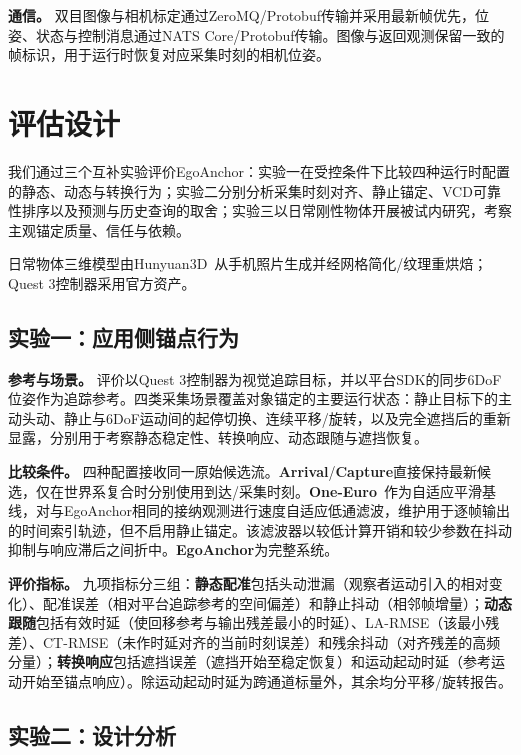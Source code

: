 \documentclass[review]{vgtc}
\begin{document}
\textbf{通信。}
双目图像与相机标定通过ZeroMQ/Protobuf传输并采用最新帧优先，位姿、状态与控制消息通过NATS Core/Protobuf传输。图像与返回观测保留一致的帧标识，用于运行时恢复对应采集时刻的相机位姿。

\section{评估设计}\label{sec:evaluation}
我们通过三个互补实验评价EgoAnchor：实验一在受控条件下比较四种运行时配置的静态、动态与转换行为；实验二分别分析采集时刻对齐、静止锚定、VCD可靠性排序以及预测与历史查询的取舍；实验三以日常刚性物体开展被试内研究，考察主观锚定质量、信任与依赖。

日常物体三维模型由Hunyuan3D~\cite{hunyuan3d22025tencent}从手机照片生成并经网格简化/纹理重烘焙；Quest 3控制器采用官方资产。

\subsection{实验一：应用侧锚点行为}\label{sec:exp1-design}

\textbf{参考与场景。}
评价以Quest 3控制器为视觉追踪目标，并以平台SDK的同步6DoF位姿作为追踪参考。四类采集场景覆盖对象锚定的主要运行状态：静止目标下的主动头动、静止与6DoF运动间的起停切换、连续平移/旋转，以及完全遮挡后的重新显露，分别用于考察静态稳定性、转换响应、动态跟随与遮挡恢复。

\textbf{比较条件。}
四种配置接收同一原始候选流。\textbf{Arrival}/\textbf{Capture}直接保持最新候选，仅在世界系复合时分别使用到达/采集时刻。\textbf{One-Euro}~\cite{casiez2012oneeuro}作为自适应平滑基线，对与EgoAnchor相同的接纳观测进行速度自适应低通滤波，维护用于逐帧输出的时间索引轨迹，但不启用静止锚定。该滤波器以较低计算开销和较少参数在抖动抑制与响应滞后之间折中。\textbf{EgoAnchor}为完整系统。

\textbf{评价指标。}
九项指标分三组：\textbf{静态配准}包括头动泄漏（观察者运动引入的相对变化）、配准误差（相对平台追踪参考的空间偏差）和静止抖动（相邻帧增量）；\textbf{动态跟随}包括有效时延（使回移参考与输出残差最小的时延）、LA-RMSE（该最小残差）、CT-RMSE（未作时延对齐的当前时刻误差）和残余抖动（对齐残差的高频分量）；\textbf{转换响应}包括遮挡误差（遮挡开始至稳定恢复）和运动起动时延（参考运动开始至锚点响应）。除运动起动时延为跨通道标量外，其余均分平移/旋转报告。

\subsection{实验二：设计分析}\label{sec:exp2-design}
\end{document}
